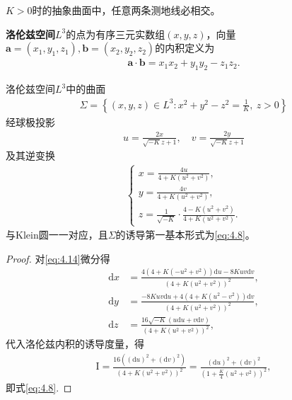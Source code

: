 \documentclass[../../main.tex]{subfiles}%
\begin{document}
\begin{remark}
$K>0$时的抽象曲面中，任意两条测地线必相交。
\end{remark}

\begin{definition}
\textbf{洛伦兹空间}$L^3$的点为有序三元实数组$(x,y,z)$，向量$\bm{a}=(x_1,y_1,z_1),\bm{b}=(x_2,y_2,z_2)$的内积定义为
\begin{align}
\bm{a}\cdot\bm{b}=x_1x_2+y_1y_2-z_1z_2.\label{eq:4.11}
\end{align}
\end{definition}

\begin{proposition}
洛伦兹空间$L^3$中的曲面
\begin{align}
\Sigma=\left\{(x,y,z)\in L^3:x^2+y^2-z^2=\frac{1}{K},\ z>0\right\}\label{eq:4.12}
\end{align}
经球极投影
\begin{align}
u=\frac{2x}{\sqrt{-K}z+1},\quad v=\frac{2y}{\sqrt{-K}z+1}\label{eq:4.13}
\end{align}
及其逆变换
\begin{align}
\begin{cases}
x=\frac{4u}{4+K(u^2+v^2)},\\
y=\frac{4v}{4+K(u^2+v^2)},\\
z=\frac{1}{\sqrt{-K}}\cdot\frac{4-K(u^2+v^2)}{4+K(u^2+v^2)}.
\end{cases}\label{eq:4.14}
\end{align}
与Klein圆一一对应，且$\Sigma$的诱导第一基本形式为\eqref{eq:4.8}。
\end{proposition}

\begin{proof}
对\eqref{eq:4.14}微分得
\begin{align*}
\mathrm{d}x&=\frac{4(4+K(-u^2+v^2))\mathrm{d}u-8Kuv\mathrm{d}v}{(4+K(u^2+v^2))^2},\\
\mathrm{d}y&=\frac{-8Kuv\mathrm{d}u+4(4+K(u^2-v^2))\mathrm{d}v}{(4+K(u^2+v^2))^2},\\
\mathrm{d}z&=\frac{16\sqrt{-K}(u\mathrm{d}u+v\mathrm{d}v)}{(4+K(u^2+v^2))^2},
\end{align*}
代入洛伦兹内积的诱导度量，得
\begin{align*}
\mathrm{I}=\frac{16((\mathrm{d}u)^2+(\mathrm{d}v)^2)}{(4+K(u^2+v^2))^2}=\frac{(\mathrm{d}u)^2+(\mathrm{d}v)^2}{\left(1+\frac{K}{4}(u^2+v^2)\right)^2},
\end{align*}
即式\eqref{eq:4.8}.
\end{proof}
\end{document}

